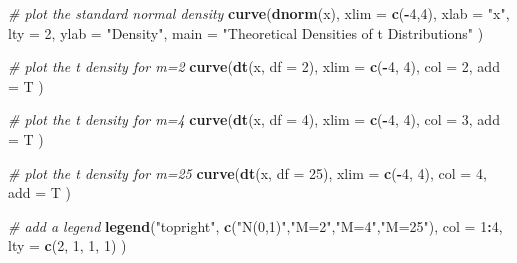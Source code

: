 \documentclass[]{book}
\newenvironment{Shaded}{\begin{snugshade}}{\end{snugshade}}
\newcommand{\KeywordTok}[1]{\textcolor[rgb]{0.13,0.29,0.53}{\textbf{#1}}}
\newcommand{\DataTypeTok}[1]{\textcolor[rgb]{0.13,0.29,0.53}{#1}}
\newcommand{\DecValTok}[1]{\textcolor[rgb]{0.00,0.00,0.81}{#1}}
\newcommand{\StringTok}[1]{\textcolor[rgb]{0.31,0.60,0.02}{#1}}
\newcommand{\CommentTok}[1]{\textcolor[rgb]{0.56,0.35,0.01}{\textit{#1}}}
\newcommand{\OperatorTok}[1]{\textcolor[rgb]{0.81,0.36,0.00}{\textbf{#1}}}
\newcommand{\NormalTok}[1]{#1}
\theoremstyle{definition}
\theoremstyle{definition}
\theoremstyle{definition}
\theoremstyle{remark}
\begin{document}
\begin{Shaded}
\begin{Highlighting}[]
\CommentTok{# plot the standard normal density}
\KeywordTok{curve}\NormalTok{(}\KeywordTok{dnorm}\NormalTok{(x), }
      \DataTypeTok{xlim =} \KeywordTok{c}\NormalTok{(}\OperatorTok{-}\DecValTok{4}\NormalTok{,}\DecValTok{4}\NormalTok{), }
      \DataTypeTok{xlab =} \StringTok{"x"}\NormalTok{, }
      \DataTypeTok{lty =} \DecValTok{2}\NormalTok{, }
      \DataTypeTok{ylab =} \StringTok{"Density"}\NormalTok{, }
      \DataTypeTok{main =} \StringTok{"Theoretical Densities of t Distributions"}
\NormalTok{      )}

\CommentTok{# plot the t density for m=2}
\KeywordTok{curve}\NormalTok{(}\KeywordTok{dt}\NormalTok{(x, }\DataTypeTok{df =} \DecValTok{2}\NormalTok{), }
      \DataTypeTok{xlim =} \KeywordTok{c}\NormalTok{(}\OperatorTok{-}\DecValTok{4}\NormalTok{, }\DecValTok{4}\NormalTok{), }
      \DataTypeTok{col =} \DecValTok{2}\NormalTok{, }
      \DataTypeTok{add =}\NormalTok{ T}
\NormalTok{      )}

\CommentTok{# plot the t density for m=4}
\KeywordTok{curve}\NormalTok{(}\KeywordTok{dt}\NormalTok{(x, }\DataTypeTok{df =} \DecValTok{4}\NormalTok{), }
      \DataTypeTok{xlim =} \KeywordTok{c}\NormalTok{(}\OperatorTok{-}\DecValTok{4}\NormalTok{, }\DecValTok{4}\NormalTok{), }
      \DataTypeTok{col =} \DecValTok{3}\NormalTok{, }
      \DataTypeTok{add =}\NormalTok{ T}
\NormalTok{      )}

\CommentTok{# plot the t density for m=25}
\KeywordTok{curve}\NormalTok{(}\KeywordTok{dt}\NormalTok{(x, }\DataTypeTok{df =} \DecValTok{25}\NormalTok{), }
      \DataTypeTok{xlim =} \KeywordTok{c}\NormalTok{(}\OperatorTok{-}\DecValTok{4}\NormalTok{, }\DecValTok{4}\NormalTok{), }
      \DataTypeTok{col =} \DecValTok{4}\NormalTok{, }
      \DataTypeTok{add =}\NormalTok{ T}
\NormalTok{      )}

\CommentTok{# add a legend}
\KeywordTok{legend}\NormalTok{(}\StringTok{"topright"}\NormalTok{, }
       \KeywordTok{c}\NormalTok{(}\StringTok{"N(0,1)"}\NormalTok{,}\StringTok{"M=2"}\NormalTok{,}\StringTok{"M=4"}\NormalTok{,}\StringTok{"M=25"}\NormalTok{), }
       \DataTypeTok{col =} \DecValTok{1}\OperatorTok{:}\DecValTok{4}\NormalTok{, }
       \DataTypeTok{lty =} \KeywordTok{c}\NormalTok{(}\DecValTok{2}\NormalTok{, }\DecValTok{1}\NormalTok{, }\DecValTok{1}\NormalTok{, }\DecValTok{1}\NormalTok{)}
\NormalTok{       )}
\end{Highlighting}
\end{Shaded}
\end{document}
